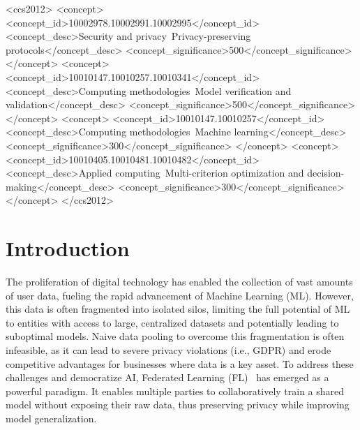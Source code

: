 \documentclass[acmsmall]{acmart}
\begin{document}
\begin{CCSXML}
<ccs2012>
   <concept>
       <concept_id>10002978.10002991.10002995</concept_id>
       <concept_desc>Security and privacy~Privacy-preserving protocols</concept_desc>
       <concept_significance>500</concept_significance>
       </concept>
   <concept>
       <concept_id>10010147.10010257.10010341</concept_id>
       <concept_desc>Computing methodologies~Model verification and validation</concept_desc>
       <concept_significance>500</concept_significance>
       </concept>
   <concept>
       <concept_id>10010147.10010257</concept_id>
       <concept_desc>Computing methodologies~Machine learning</concept_desc>
       <concept_significance>300</concept_significance>
       </concept>
   <concept>
       <concept_id>10010405.10010481.10010482</concept_id>
       <concept_desc>Applied computing~Multi-criterion optimization and decision-making</concept_desc>
       <concept_significance>300</concept_significance>
       </concept>
 </ccs2012>
\end{CCSXML}




\maketitle

\section{Introduction}

The proliferation of digital technology has enabled the collection of vast amounts of user data, fueling the rapid advancement of Machine Learning (ML). However, this data is often fragmented into isolated silos, limiting the full potential of ML to entities with access to large, centralized datasets and potentially leading to suboptimal models. Naive data pooling to overcome this fragmentation is often infeasible, as it can lead to severe privacy violations (i.e., GDPR) and erode competitive advantages for businesses where data is a key asset. To address these challenges and democratize AI, Federated Learning (FL)~\cite{mcmahan2017communication} has emerged as a powerful paradigm. It enables multiple parties to collaboratively train a shared model without exposing their raw data, thus preserving privacy while improving model generalization. 
\end{document}
